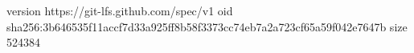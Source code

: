version https://git-lfs.github.com/spec/v1
oid sha256:3b646535f11accf7d33a925ff8b58f3373cc74eb7a2a723cf65a59f042e7647b
size 524384
